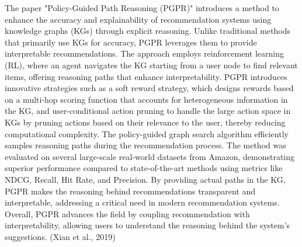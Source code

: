 The paper "Policy-Guided Path Reasoning (PGPR)" introduces a method to enhance the accuracy and explainability of recommendation systems using knowledge graphs (KGs) through explicit reasoning. Unlike traditional methods that primarily use KGs for accuracy, PGPR leverages them to provide interpretable recommendations. The approach employs reinforcement learning (RL), where an agent navigates the KG starting from a user node to find relevant items, offering reasoning paths that enhance interpretability. PGPR introduces innovative strategies such as a soft reward strategy, which designs rewards based on a multi-hop scoring function that accounts for heterogeneous information in the KG, and user-conditional action pruning to handle the large action space in KGs by pruning actions based on their relevance to the user, thereby reducing computational complexity. The policy-guided graph search algorithm efficiently samples reasoning paths during the recommendation process. The method was evaluated on several large-scale real-world datasets from Amazon, demonstrating superior performance compared to state-of-the-art methods using metrics like NDCG, Recall, Hit Rate, and Precision. By providing actual paths in the KG, PGPR makes the reasoning behind recommendations transparent and interpretable, addressing a critical need in modern recommendation systems. Overall, PGPR advances the field by coupling recommendation with interpretability, allowing users to understand the reasoning behind the system's suggestions. (Xian et al., 2019)

